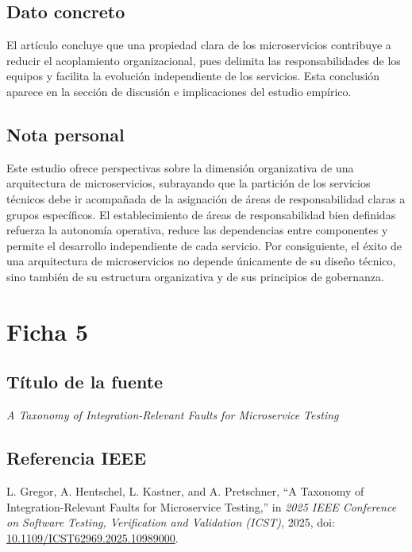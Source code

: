 \documentclass[11pt]{article}
\begin{document}
\subsection*{Dato concreto}
El artículo concluye que una propiedad clara de los microservicios contribuye a reducir el acoplamiento organizacional, pues delimita las responsabilidades de los equipos y facilita la evolución independiente de los servicios. Esta conclusión aparece en la sección de discusión e implicaciones del estudio empírico.

\subsection*{Nota personal}
Este estudio ofrece perspectivas sobre la dimensión organizativa de una arquitectura de microservicios, subrayando que la partición de los servicios técnicos debe ir acompañada de la asignación de áreas de responsabilidad claras a grupos específicos. El establecimiento de áreas de responsabilidad bien definidas refuerza la autonomía operativa, reduce las dependencias entre componentes y permite el desarrollo independiente de cada servicio. Por consiguiente, el éxito de una arquitectura de microservicios no depende únicamente de su diseño técnico, sino también de su estructura organizativa y de sus principios de gobernanza.


\section*{Ficha 5}

\subsection*{Título de la fuente}
\textit{A Taxonomy of Integration-Relevant Faults for Microservice Testing}

\subsection*{Referencia IEEE}
L. Gregor, A. Hentschel, L. Kastner, and A. Pretschner, ``A Taxonomy of Integration-Relevant Faults for Microservice Testing,'' in \textit{2025 IEEE Conference on Software Testing, Verification and Validation (ICST)}, 2025, doi: \href{https://doi.org/10.1109/ICST62969.2025.10989000}{10.1109/ICST62969.2025.10989000}.
\end{document}
